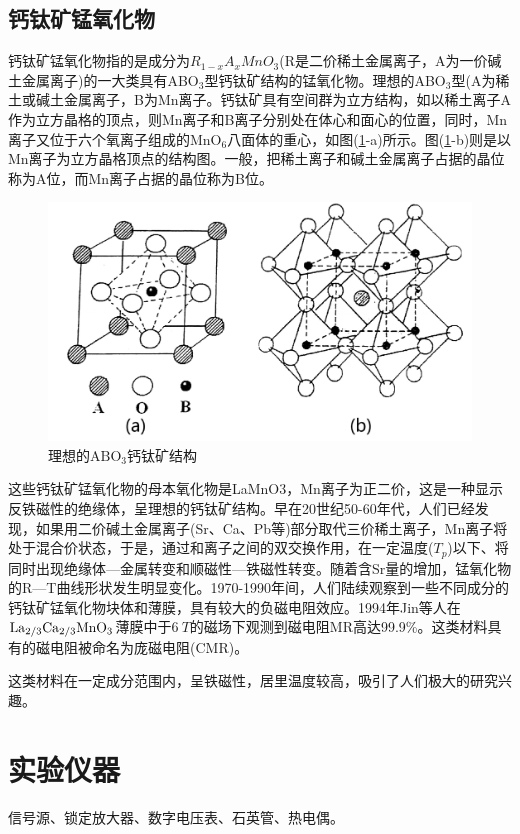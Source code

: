 \documentclass[a4paper]{article}
\begin{document}
\subsection{钙钛矿锰氧化物}
钙钛矿锰氧化物指的是成分为$R_{1-x}A_xMnO_3$(R是二价稀土金属离子，A为一价碱土金属离子)的一大类具有ABO$_3$型钙钛矿结构的锰氧化物。理想的ABO$_3$型(A为稀土或碱土金属离子，B为Mn离子。钙钛矿具有空间群为立方结构，如以稀土离子A作为立方晶格的顶点，则Mn离子和B离子分别处在体心和面心的位置，同时，Mn离子又位于六个氧离子组成的MnO$_6$八面体的重心，如图(\ref{fig3}-a)所示。图(\ref{fig3}-b)则是以Mn离子为立方晶格顶点的结构图。一般，把稀土离子和碱土金属离子占据的晶位称为A位，而Mn离子占据的晶位称为B位。
\begin{figure}[!h]
    \centering
    \includegraphics[width=\textwidth]{fig/fig3.pdf}
    \caption{理想的$\text{ABO}_3$钙钛矿结构}\label{fig3}
\end{figure}
这些钙钛矿锰氧化物的母本氧化物是LaMnO3，Mn离子为正二价，这是一种显示反铁磁性的绝缘体，呈理想的钙钛矿结构。早在20世纪50-60年代，人们已经发现，如果用二价碱土金属离子(Sr、Ca、Pb等)部分取代三价稀土离子，Mn离子将处于混合价状态，于是，通过和离子之间的双交换作用\cite{jonker1950ferromagnetic}\cite{van1950electrical}，在一定温度($T_p$)以下、将同时出现绝缘体—金属转变和顺磁性—铁磁性转变\cite{anderson1955considerations}\cite{zener1951interaction}。随着含Sr量的增加，锰氧化物的R—T曲线形状发生明显变化。1970-1990年间，人们陆续观察到一些不同成分的钙钛矿锰氧化物块体和薄膜，具有较大的负磁电阻效应。1994年Jin等人在$ \ce{La_{2/3}Ca_{2/3}MnO_3} $薄膜中于$ \SI{6}{T} $的磁场下观测到磁电阻MR高达99.9\%\cite{jin1994colossal}\cite{jin1994thousandfold}\cite{mccormack1994very}。这类材料具有的磁电阻被命名为庞磁电阻(CMR)。

这类材料在一定成分范围内，呈铁磁性，居里温度较高，吸引了人们极大的研究兴趣。

\section{实验仪器}
信号源、锁定放大器、数字电压表、石英管、热电偶。
\end{document}
